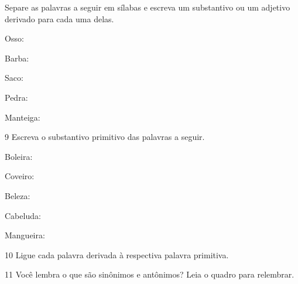Separe as palavras a seguir em sílabas e escreva um substantivo ou um
adjetivo derivado para cada uma delas.

\begin{escolha}[itemsep=-5pt]
\item Osso: 
\item
  Barba: 
\item
  Saco: 
\item
  Pedra: 
\item
  Manteiga: 
\end{escolha}

\num{9} Escreva o substantivo primitivo das palavras a seguir.

\begin{escolha}[itemsep=-5pt]
\item Boleira: 

\item Coveiro: 

\item Beleza: 

\item Cabeluda: 

\item Mangueira: 

\end{escolha}

\pagebreak

\num{10} Ligue cada palavra derivada à respectiva palavra primitiva.

\begin{multicols}{2}







\end{multicols}

\num{11} Você lembra o que são sinônimos e antônimos? Leia o quadro para
relembrar.

